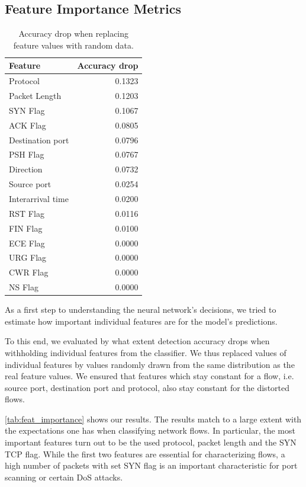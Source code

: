\documentclass[conference]{IEEEtran}
\begin{document}
\subsection{Feature Importance Metrics}
\begin{table}
\caption{Accuracy drop when replacing feature values with random data.}
\label{tab:feat_importance}
\begin{tabular}{l r}
\toprule
Feature & Accuracy drop \\ \midrule
Protocol	&	0.1323	\\
Packet Length	&	0.1203	\\
SYN Flag	&	0.1067	\\
ACK Flag	&	0.0805	\\
Destination port	&	0.0796	\\
PSH Flag	&	0.0767	\\
Direction	&	0.0732	\\
Source port	&	0.0254	\\
Interarrival time	&	0.0200	\\
RST Flag	&	0.0116	\\
FIN Flag	&	0.0100	\\
ECE	Flag &	0.0000	\\
URG Flag	&	0.0000	\\
CWR Flag	&	0.0000	\\
NS Flag	&	0.0000	\\
\bottomrule
\end{tabular}
\end{table}
As a first step to understanding the neural network's decisions, we tried to estimate how important individual features are for the model's predictions.

To this end, we evaluated by what extent detection accuracy drops when withholding individual features from the classifier. We thus replaced values of individual features by values randomly drawn from the same distribution as the real feature values. We ensured that features which stay constant for a flow, i.e. source port, destination port and protocol, also stay constant for the distorted flows.

\autoref{tab:feat_importance} shows our results. The results match to a large extent with the expectations one has when classifying network flows. In particular,  the most important features turn out to be the used protocol, packet length and the SYN TCP flag. While the first two features are essential for characterizing flows, a high number of packets with set SYN flag is an important characteristic for port scanning or certain DoS attacks.
\end{document}
